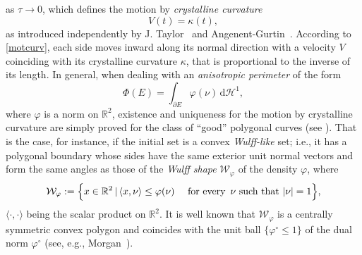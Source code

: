 \documentclass{interact}
\numberwithin{equation}{section}
\theoremstyle{definition}
\newcommand{\R}{\mathbb{R}}
\renewcommand{\H}{\mathcal{H}}
\begin{document}
as $\tau\to0$, which defines %
the motion by \emph{crystalline curvature}~\cite{AT95}
\begin{equation}
V(t)=\kappa(t),
\label{motcurv}
\end{equation}
as introduced independently by J. Taylor~\cite{Ta} and Angenent-Gurtin~\cite{AG}. According to \eqref{motcurv}, each side moves inward along its normal direction with a velocity $V$ coinciding with its crystalline curvature $\kappa$, that is proportional to the inverse of its length. In general, when dealing with %
an \emph{anisotropic perimeter} of the form
\begin{equation*}
\Phi(E)=\int_{\partial E}\varphi(\nu)\,\mathrm{d}\mathcal{H}^1,
\end{equation*}
where $\varphi$ is a norm on $\mathbb{R}^2$, {existence and uniqueness for the motion by crystalline curvature are simply proved for the class of ``good'' polygonal curves (see \cite[Prop. 2.1.1]{Ta}). That is the case, for instance,} if the initial set is a convex \emph{Wulff-like} set; i.e., it has a polygonal boundary %
whose sides have the same exterior unit normal vectors and form the same angles as those of the \emph{Wulff shape} $\mathcal{W}_\varphi$ of the density $\varphi$, where
\begin{equation}
\mathcal{W}_\varphi:=\Bigl\{x\in\mathbb{R}^2\,|\,\langle x,\nu\rangle\leq\varphi(\nu)\quad\text{ for every }\,\nu\mbox{ such that }|\nu|=1\Bigr\},
\end{equation}
$\langle\cdot,\cdot\rangle$ being the scalar product on $\R^2$. It is well known that $\mathcal{W}_\varphi$ is a centrally symmetric convex polygon and coincides with the unit ball $\{\varphi^\circ\leq1\}$ of the dual norm $\varphi^\circ$ (see, e.g., Morgan~\cite{FM}).
\end{document}
